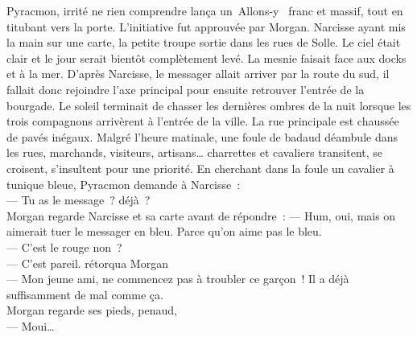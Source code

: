 \documentclass[french, a4paper, 12pt]{article}
\begin{document}
Pyracmon, irrité ne rien comprendre lança un~\og Allons-y \fg~franc et massif, tout en titubant vers la porte. L'initiative fut approuvée par Morgan. Narcisse ayant mis la main sur une carte, la petite troupe sortie dans les rues de Solle. Le ciel était clair et le jour serait bientôt complètement levé. La mesnie faisait face aux docks et à la mer. D'après Narcisse, le messager allait arriver par la route du sud, il fallait donc rejoindre l'axe principal pour ensuite retrouver l'entrée de la bourgade. Le soleil terminait de chasser les dernières ombres de la nuit lorsque les trois compagnons arrivèrent à l'entrée de la ville. La rue principale est chaussée de pavés inégaux. Malgré l'heure matinale, une foule de badaud déambule dans les rues, marchands, visiteurs, artisans… charrettes et cavaliers transitent, se croisent, s'insultent pour une priorité. En cherchant dans la foule un cavalier à tunique bleue, Pyracmon demande à Narcisse~:\\
--- Tu as le message~? déjà~?\\
Morgan regarde Narcisse et sa carte avant de répondre~:
--- Hum, oui, mais on aimerait tuer le messager en bleu. Parce qu'on aime pas le bleu.\\
--- C'est le rouge non~?\\
--- C'est pareil. rétorqua Morgan\\
--- Mon jeune ami, ne commencez pas à troubler ce garçon~! Il a déjà suffisamment de mal comme ça.\\
Morgan regarde ses pieds, penaud,\\
--- Moui…\\
\end{document}
